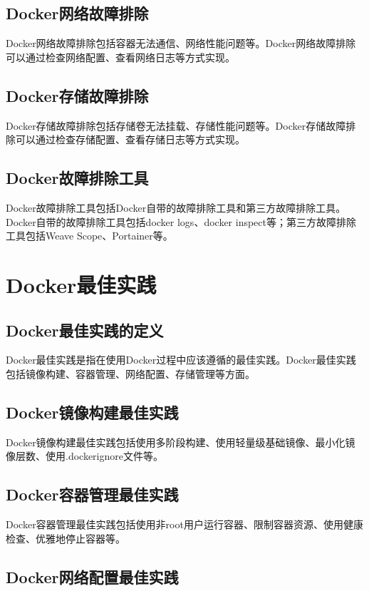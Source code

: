 \documentclass[12pt,UTF8]{ctexbook}
\begin{document}
\section{Docker网络故障排除}

Docker网络故障排除包括容器无法通信、网络性能问题等。Docker网络故障排除可以通过检查网络配置、查看网络日志等方式实现。

\section{Docker存储故障排除}

Docker存储故障排除包括存储卷无法挂载、存储性能问题等。Docker存储故障排除可以通过检查存储配置、查看存储日志等方式实现。

\section{Docker故障排除工具}

Docker故障排除工具包括Docker自带的故障排除工具和第三方故障排除工具。Docker自带的故障排除工具包括docker logs、docker inspect等；第三方故障排除工具包括Weave Scope、Portainer等。

\chapter{Docker最佳实践}

\section{Docker最佳实践的定义}

Docker最佳实践是指在使用Docker过程中应该遵循的最佳实践。Docker最佳实践包括镜像构建、容器管理、网络配置、存储管理等方面。

\section{Docker镜像构建最佳实践}

Docker镜像构建最佳实践包括使用多阶段构建、使用轻量级基础镜像、最小化镜像层数、使用.dockerignore文件等。

\section{Docker容器管理最佳实践}

Docker容器管理最佳实践包括使用非root用户运行容器、限制容器资源、使用健康检查、优雅地停止容器等。

\section{Docker网络配置最佳实践}
\end{document}
